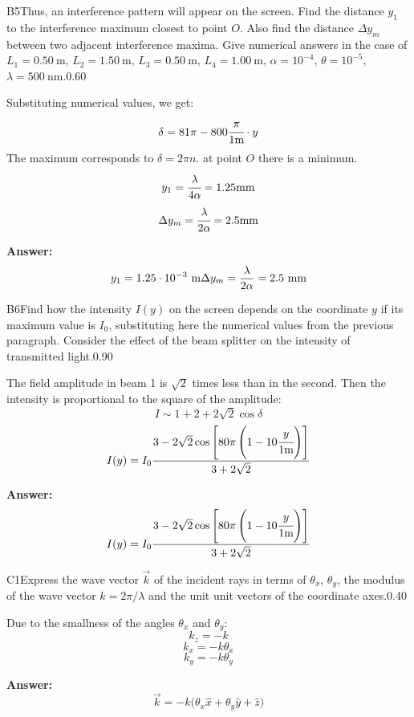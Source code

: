\documentclass[11pt,a4paper]{article}
\begin{document}
\begin{solcard}{B5}{Thus, an interference pattern will appear on the screen. Find the distance $y_1$ to the interference maximum closest to point $O$. Also find the distance $\Delta y_m$ between two adjacent interference maxima. Give numerical answers in the case of $L_1=0.50~\mathrm{m}$, $L_2=1.50~\mathrm{m}$, $L_3=0.50~\mathrm{m}$, $L_4=1.00~\mathrm{m}$, $\alpha=10^{-4}$, $\theta=10^{-5}$, $\lambda=500~\mathrm{nm}$.}{0.60}

Substituting numerical values, we get: $$\delta = 81\pi - 800\cfrac{\pi}{1\text{m}}\cdot y$$The maximum corresponds to $\delta = 2\pi n$. at point $O$ there is a minimum. $$y_1 = \cfrac{\lambda}{4\alpha} = 1.25\text{mm}$$$$\Delta y_m = \cfrac{\lambda}{2\alpha} = 2.5\text{mm}$$

\par\smallskip\noindent\textbf{Answer:} \[y_1=1.25\cdot10^{-3}~\mathrm{m}\\\Delta y_m=\frac\lambda{2\alpha}=2.5~\mathrm{mm}\]
\end{solcard}

\begin{solcard}{B6}{Find how the intensity $I(y)$ on the screen depends on the coordinate $y$ if its maximum value is $I_0$, substituting here the numerical values from the previous paragraph. Consider the effect of the beam splitter on the intensity of transmitted light.}{0.90}

The field amplitude in beam 1 is $\sqrt{2}$ times less than in the second. Then the intensity is proportional to the square of the amplitude: $$I \sim 1 + 2 + 2\sqrt{2}\cos{\delta}$$$$I(y)=I_0\frac{3-2\sqrt2\cos\left[80\pi\left(1-10\cfrac{y}{1\text{m}}\right)\right]}{3+2\sqrt2}$$

\par\smallskip\noindent\textbf{Answer:} \[I(y)=I_0\frac{3-2\sqrt2\cos\left[80\pi\left(1-10\cfrac{y}{1\text{m}}\right)\right]}{3+2\sqrt2}\]
\end{solcard}

\begin{solcard}{C1}{Express the wave vector $\vec k$ of the incident rays in terms of $\theta_x$, $\theta_y$, the modulus of the wave vector $k=2\pi/\lambda$ and the unit unit vectors of the coordinate axes.}{0.40}

Due to the smallness of the angles $\theta_x$ and $\theta_y$: $$k_z = - k$$$$k_x = -k\theta_x$$$$k_y = -k\theta_y$$

\par\smallskip\noindent\textbf{Answer:} \[\vec k=-k\big(\theta_x\hat x+\theta_y\hat y+\hat z\big)\]
\end{solcard}
\end{document}
